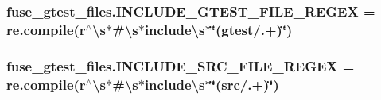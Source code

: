 \subsubsection[{\texorpdfstring{I\+N\+C\+L\+U\+D\+E\+\_\+\+G\+T\+E\+S\+T\+\_\+\+F\+I\+L\+E\+\_\+\+R\+E\+G\+EX}{INCLUDE_GTEST_FILE_REGEX}}]{\setlength{\rightskip}{0pt plus 5cm}fuse\+\_\+gtest\+\_\+files.\+I\+N\+C\+L\+U\+D\+E\+\_\+\+G\+T\+E\+S\+T\+\_\+\+F\+I\+L\+E\+\_\+\+R\+E\+G\+EX = re.\+compile(r\textquotesingle{}$^\wedge$\textbackslash{}s$\ast$\#\textbackslash{}s$\ast$include\textbackslash{}s$\ast$\char`\"{}(gtest/.+)\char`\"{}\textquotesingle{})}\hypertarget{namespacefuse__gtest__files_ad7abe9bfa06bb1c5411e8b4a7a686e5b}{}\label{namespacefuse__gtest__files_ad7abe9bfa06bb1c5411e8b4a7a686e5b}
\subsubsection[{\texorpdfstring{I\+N\+C\+L\+U\+D\+E\+\_\+\+S\+R\+C\+\_\+\+F\+I\+L\+E\+\_\+\+R\+E\+G\+EX}{INCLUDE_SRC_FILE_REGEX}}]{\setlength{\rightskip}{0pt plus 5cm}fuse\+\_\+gtest\+\_\+files.\+I\+N\+C\+L\+U\+D\+E\+\_\+\+S\+R\+C\+\_\+\+F\+I\+L\+E\+\_\+\+R\+E\+G\+EX = re.\+compile(r\textquotesingle{}$^\wedge$\textbackslash{}s$\ast$\#\textbackslash{}s$\ast$include\textbackslash{}s$\ast$\char`\"{}(src/.+)\char`\"{}\textquotesingle{})}\hypertarget{namespacefuse__gtest__files_aec4e054d0ab27276d6150468bb98a8a4}{}\label{namespacefuse__gtest__files_aec4e054d0ab27276d6150468bb98a8a4}
